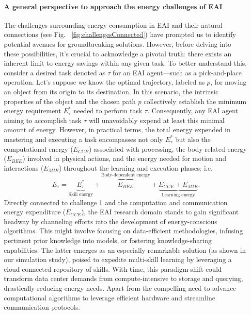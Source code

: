 \documentclass[12pt]{article}
\begin{document}
\paragraph*{A general perspective to approach the energy challenges of EAI}
The challenges surrounding energy consumption in EAI and their natural connections (see Fig.~	\ref{fig:challengesConnected}) have prompted us to identify potential avenues for groundbreaking solutions. However, before delving into these possibilities, it's crucial to acknowledge a pivotal truth: there exists an inherent limit to energy savings within any given task. To better understand this, consider a desired task denoted as $\tau$ for an EAI agent---such as a pick-and-place operation. Let's suppose we know the optimal trajectory, labeled as $p$, for moving an object from its origin to its destination. In this scenario, the intrinsic properties of the object and the chosen path $p$ collectively establish the minimum energy requirement $E^*_{\tau}$ needed to perform task $\tau$. Consequently, any EAI agent aiming to accomplish task $\tau$ will unavoidably expend at least this minimal amount of energy. However, in practical terms, the total energy expended in mastering and executing a task encompasses not only $E^*_{\tau}$ but also the computational energy ($E_{CCE}$) associated with processing, the body-related energy ($E_{BEE}$) involved in physical actions, and the energy needed for motion and interactions ($E_{MIE}$) throughout the learning and execution phases; i.e.
\begin{equation}
	E_{\tau} =  \underbrace{E^*_{\tau}}_{\text{Skill energy}} + \overbrace{E_{BEE}}^{\text{Body-dependent energy}} + \underbrace{E_{CCE} + E_{MIE}}_{\text{Learning energy}}.
\end{equation}
Directly connected to challenge 1 and the computation and communication energy expenditure ($E_{CCE}$), the EAI research domain stands to gain significant headway by channeling efforts into the development of energy-conscious algorithms. This might involve focusing on data-efficient methodologies, infusing pertinent prior knowledge into models, or fostering knowledge-sharing capabilities. The latter emerges as an especially remarkable solution (as shown in our simulation study), poised to expedite multi-skill learning by leveraging a cloud-connected repository of skills. With time, this paradigm shift could transform data center demands from compute-intensive to storage and querying, drastically reducing energy needs. Apart from the compelling need to advance computational algorithms to leverage efficient hardware and streamline communication protocols.
\end{document}
